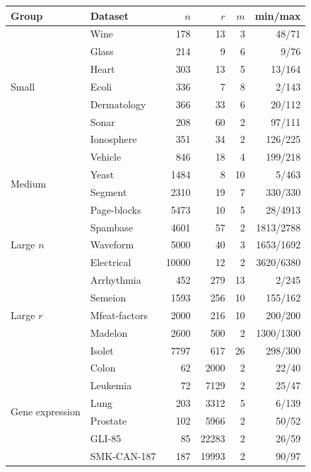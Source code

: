 \begin{minipage}{\linewidth}
\centering
{}
\label{tab:datasets}
\small
\begin{tabular}{@{}llrrrr@{}}
\toprule
Group & Dataset & $n$ & $r$ & $m$ & min/max \\
\midrule
\multirow{7}{*}{Small} & Wine & 178 & 13 & 3 & 48/71 \\
 & Glass & 214 & 9 & 6 & 9/76 \\
 & Heart & 303 & 13 & 5 & 13/164 \\
 & Ecoli & 336 & 7 & 8 & 2/143 \\
 & Dermatology & 366 & 33 & 6 & 20/112 \\
 & Sonar & 208 & 60 & 2 & 97/111 \\
 & Ionosphere & 351 & 34 & 2 & 126/225 \\
\midrule
\multirow{4}{*}{Medium} & Vehicle & 846 & 18 & 4 & 199/218 \\
 & Yeast & 1484 & 8 & 10 & 5/463 \\
 & Segment & 2310 & 19 & 7 & 330/330 \\
 & Page-blocks & 5473 & 10 & 5 & 28/4913 \\
\midrule
\multirow{3}{*}{Large $n$} & Spambase & 4601 & 57 & 2 & 1813/2788 \\
 & Waveform & 5000 & 40 & 3 & 1653/1692 \\
 & Electrical & 10000 & 12 & 2 & 3620/6380 \\
\midrule
\multirow{5}{*}{Large $r$} & Arrhythmia & 452 & 279 & 13 & 2/245 \\
 & Semeion & 1593 & 256 & 10 & 155/162 \\
 & Mfeat-factors & 2000 & 216 & 10 & 200/200 \\
 & Madelon & 2600 & 500 & 2 & 1300/1300 \\
 & Isolet & 7797 & 617 & 26 & 298/300 \\
\midrule
\multirow{6}{*}{Gene expression} & Colon & 62 & 2000 & 2 & 22/40 \\
 & Leukemia & 72 & 7129 & 2 & 25/47 \\
 & Lung & 203 & 3312 & 5 & 6/139 \\
 & Prostate & 102 & 5966 & 2 & 50/52 \\
 & GLI-85 & 85 & 22283 & 2 & 26/59 \\
 & SMK-CAN-187 & 187 & 19993 & 2 & 90/97 \\
\bottomrule
\end{tabular}
\end{minipage}\par
